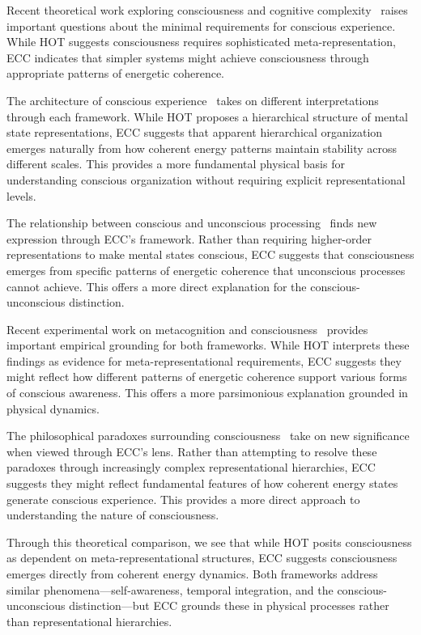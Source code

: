 Recent theoretical work exploring consciousness and cognitive complexity~\cite{LeDoux2017, Cleeremans2011} raises important questions about the minimal requirements for conscious experience. While HOT suggests consciousness requires sophisticated meta-representation, ECC indicates that simpler systems might achieve consciousness through appropriate patterns of energetic coherence.

The architecture of conscious experience~\cite{Rosenthal2005, Carruthers2000} takes on different interpretations through each framework. While HOT proposes a hierarchical structure of mental state representations, ECC suggests that apparent hierarchical organization emerges naturally from how coherent energy patterns maintain stability across different scales. This provides a more fundamental physical basis for understanding conscious organization without requiring explicit representational levels.

The relationship between conscious and unconscious processing~\cite{Armstrong1968, Lau2011} finds new expression through ECC's framework. Rather than requiring higher-order representations to make mental states conscious, ECC suggests that consciousness emerges from specific patterns of energetic coherence that unconscious processes cannot achieve. This offers a more direct explanation for the conscious-unconscious distinction.

Recent experimental work on metacognition and consciousness~\cite{Brown2019, Rosenthal2019} provides important empirical grounding for both frameworks. While HOT interprets these findings as evidence for meta-representational requirements, ECC suggests they might reflect how different patterns of energetic coherence support various forms of conscious awareness. This offers a more parsimonious explanation grounded in physical dynamics.

The philosophical paradoxes surrounding consciousness~\cite{Gennaro2012, Chalmers2018} take on new significance when viewed through ECC's lens. Rather than attempting to resolve these paradoxes through increasingly complex representational hierarchies, ECC suggests they might reflect fundamental features of how coherent energy states generate conscious experience. This provides a more direct approach to understanding the nature of consciousness.

Through this theoretical comparison, we see that while HOT posits consciousness as dependent on meta-representational structures, ECC suggests consciousness emerges directly from coherent energy dynamics. Both frameworks address similar phenomena—self-awareness, temporal integration, and the conscious-unconscious distinction—but ECC grounds these in physical processes rather than representational hierarchies.


